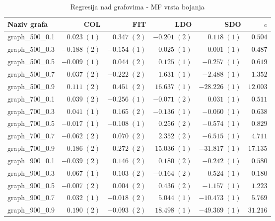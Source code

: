 \documentclass[times, utf8, diplomski, numeric]{fer}
\begin{document}
\begin{table}[htb]
	\caption{Regresija nad grafovima - MF vrsta bojanja}
	\label{tbl:regresija-MF}
	\centering
	\begin{tabular}{|l|r|r|r|r|r|} \hline
	Naziv grafa & COL & FIT & LDO & SDO & $e$ \\ \hline \hline
graph\_500\_0.1 & $ 0.023\; (1) $ & $ 0.347\; (2) $ & $ -0.201\; (2) $ & $ 0.118\; (1) $ & $ 0.504 $\\ \hline
graph\_500\_0.3 & $ -0.188\; (2) $ & $ -0.154\; (1) $ & $ 0.025\; (1) $ & $ 0.001\; (1) $ & $ 0.487 $\\ \hline
graph\_500\_0.5 & $ -0.009\; (1) $ & $ 0.044\; (2) $ & $ 0.125\; (1) $ & $ -0.257\; (1) $ & $ 0.619 $\\ \hline
graph\_500\_0.7 & $ 0.037\; (2) $ & $ -0.222\; (2) $ & $ 1.631\; (1) $ & $ -2.488\; (1) $ & $ 1.352 $\\ \hline
graph\_500\_0.9 & $ 0.111\; (2) $ & $ 0.451\; (2) $ & $ 16.637\; (1) $ & $ -28.226\; (1) $ & $ 12.003 $\\ \hline
graph\_700\_0.1 & $ 0.039\; (2) $ & $ -0.256\; (1) $ & $ -0.071\; (2) $ & $ 0.031\; (1) $ & $ 0.511 $\\ \hline
graph\_700\_0.3 & $ 0.041\; (1) $ & $ 0.165\; (2) $ & $ -0.136\; (1) $ & $ -0.060\; (1) $ & $ 0.638 $\\ \hline
graph\_700\_0.5 & $ -0.017\; (1) $ & $ -0.108\; (1) $ & $ 0.256\; (2) $ & $ -0.574\; (1) $ & $ 0.829 $\\ \hline
graph\_700\_0.7 & $ -0.062\; (2) $ & $ 0.070\; (2) $ & $ 2.352\; (2) $ & $ -6.515\; (1) $ & $ 4.711 $\\ \hline
graph\_700\_0.9 & $ 0.186\; (2) $ & $ 0.272\; (2) $ & $ 15.036\; (1) $ & $ -31.817\; (1) $ & $ 17.135 $\\ \hline
graph\_900\_0.1 & $ -0.039\; (2) $ & $ 0.146\; (2) $ & $ 0.180\; (2) $ & $ -0.242\; (1) $ & $ 0.580 $\\ \hline
graph\_900\_0.3 & $ 0.067\; (1) $ & $ 0.103\; (2) $ & $ -0.164\; (2) $ & $ 0.524\; (1) $ & $ 0.180 $\\ \hline
graph\_900\_0.5 & $ -0.007\; (2) $ & $ 0.004\; (2) $ & $ 0.436\; (2) $ & $ -1.157\; (1) $ & $ 1.223 $\\ \hline
graph\_900\_0.7 & $ 0.032\; (1) $ & $ -0.018\; (2) $ & $ 5.044\; (1) $ & $ -10.473\; (1) $ & $ 5.769 $\\ \hline
graph\_900\_0.9 & $ 0.190\; (2) $ & $ -0.093\; (2) $ & $ 18.498\; (1) $ & $ -49.369\; (1) $ & $ 31.216 $\\ \hline
	\end{tabular}
\end{table} 
\end{document}
